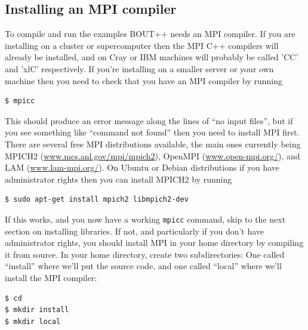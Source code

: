 \documentclass[12pt]{article}
\begin{document}
\subsection{Installing an MPI compiler}
\label{sec:installmpi}

To compile and run the examples BOUT++ needs an MPI compiler.
If you are installing on a cluster or supercomputer then the MPI
C++ compilers will already be installed, and on Cray or IBM
machines will probably be called 'CC' and 'xlC' respectively.
If you're installing on a smaller server or your own machine then you need
to check that you have an MPI compiler by running
\begin{verbatim}
$ mpicc
\end{verbatim}

This should produce an error message along the lines of ``no input files'', but
if you see something like ``command not found'' then you need to install MPI first.
There are several free MPI distributions available, the main ones currently being
MPICH2 (\url{www.mcs.anl.gov/mpi/mpich2}), OpenMPI (\url{www.open-mpi.org/}),
and LAM (\url{www.lam-mpi.org/}).
On Ubuntu or Debian distributions if you have administrator rights then
you can install MPICH2 by running
\begin{verbatim}
$ sudo apt-get install mpich2 libmpich2-dev
\end{verbatim}

If this works, and you now have a working \texttt{mpicc} command,
skip to the next section on installing libraries. If not, and
particularly if you don't have administrator rights, you should
install MPI in your home directory by compiling it from source.
In your home directory,
create two subdirectories: One called ``install'' where we'll put the source code, and one called ``local'' where we'll install the MPI compiler:
\begin{verbatim}
$ cd
$ mkdir install
$ mkdir local
\end{verbatim}
\end{document}
